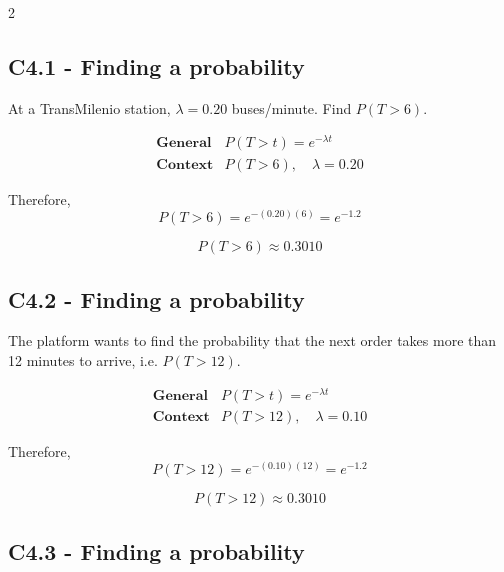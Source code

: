 	
\begin{multicols}{2}


\subsection*{C4.1 - Finding a probability}
\label{subsec:c4-probability-transmilenio}

At a TransMilenio station, $\lambda=0.20$ buses/minute. Find
$P(T>6)$.

\[
\begin{array}{c|c}
	\textbf{General} & P(T>t)=e^{-\lambda t}\\[6pt]
	\textbf{Context} & P(T>6),\quad \lambda=0.20
\end{array}
\]

Therefore,
\[
P(T>6)=e^{-(0.20)(6)}
=e^{-1.2}
\]

\[
\boxed{P(T>6)\approx0.3010}
\]



\subsection*{C4.2 - Finding a probability}
\label{subsec:c4-probability-delivery}

The platform wants to find the probability that the next order takes
more than 12 minutes to arrive, i.e. $P(T>12)$.

\[
\begin{array}{c|c}
	\textbf{General} & P(T>t)=e^{-\lambda t}\\[6pt]
	\textbf{Context} & P(T>12),\quad \lambda=0.10
\end{array}
\]

Therefore,
\[
P(T>12)=e^{-(0.10)(12)}
=e^{-1.2}
\]

\[
\boxed{P(T>12)\approx0.3010}
\]



\subsection*{C4.3 - Finding a probability}
\label{subsec:c4-probability-rides}


\end{multicols}
